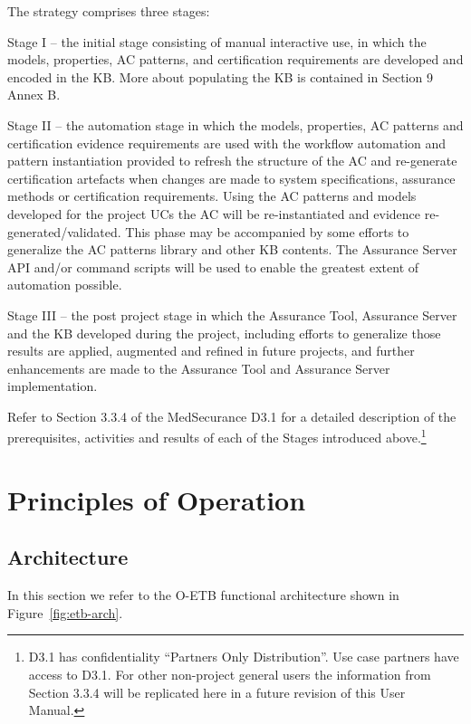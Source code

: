 \documentclass[12pt,twoside,a4paper]{article}
\begin{document}
The strategy comprises three stages:

Stage I -- the initial stage consisting of manual interactive use, in which the models, properties, AC patterns, and certification requirements are developed and encoded in the KB. More about populating the KB is contained in Section 9 Annex B.

Stage II -- the automation stage in which the models, properties, AC patterns and certification evidence requirements are used with the workflow automation and pattern instantiation provided to refresh the structure of the AC and re-generate certification artefacts when changes are made to system specifications, assurance methods or certification requirements. Using the AC patterns and models developed for the project UCs the AC will be re-instantiated and evidence re-generated/validated. This phase may be accompanied by some efforts to generalize the AC patterns library and other KB contents. The Assurance Server API and/or command scripts will be used to enable the greatest extent of automation possible.

Stage III -- the post project stage in which the Assurance Tool, Assurance Server and the KB developed during the project, including efforts to generalize those results are applied, augmented and refined in future projects, and further enhancements are made to the Assurance Tool and Assurance Server implementation.

Refer to Section 3.3.4 of the MedSecurance D3.1 for a detailed description of the prerequisites, activities and results of each of the Stages introduced above.\footnote{D3.1 has confidentiality ``Partners Only Distribution''. Use case partners have access to D3.1. For other non-project general users the information from Section 3.3.4 will be replicated here in a future revision of this User Manual.}

\clearpage
\hypertarget{principles-of-operation}{%
\section{Principles of Operation}\label{principles-of-operation}}

\hypertarget{architecture}{%
\subsection{Architecture}\label{architecture}}

In this section we refer to the O-ETB functional architecture shown in Figure~\ref{fig:etb-arch}.
\end{document}
